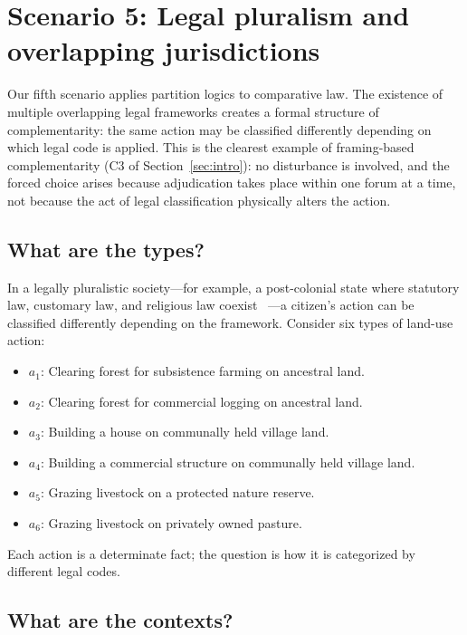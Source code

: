 \documentclass[aps,pra,twocolumn,superscriptaddress,floatfix,longbibliography]{revtex4-2}
\begin{document}
\section{Scenario 5: Legal pluralism and overlapping jurisdictions}
\label{sec:legal}

Our fifth scenario applies partition logics to comparative law. The
existence of multiple overlapping legal frameworks creates a formal
structure of complementarity: the same action may be classified
differently depending on which legal code is applied. This is the
clearest example of framing-based complementarity (C3 of
Section~\ref{sec:intro}): no disturbance is involved, and the
forced choice arises because adjudication takes place within one
forum at a time, not because the act of legal classification
physically alters the action.

\subsection{What are the types?}

In a legally pluralistic society---for example, a post-colonial
state where statutory law, customary law, and religious law coexist
~\cite{Merry1988,Griffiths1986}---a citizen's action can be
classified differently depending on the framework. Consider six
types of land-use action:
\begin{itemize}
\item $a_1$: Clearing forest for subsistence farming on ancestral
land.
\item $a_2$: Clearing forest for commercial logging on ancestral
land.
\item $a_3$: Building a house on communally held village land.
\item $a_4$: Building a commercial structure on communally held
village land.
\item $a_5$: Grazing livestock on a protected nature reserve.
\item $a_6$: Grazing livestock on privately owned pasture.
\end{itemize}
Each action is a determinate fact; the question is how it is
categorized by different legal codes.

\subsection{What are the contexts?}
\end{document}
